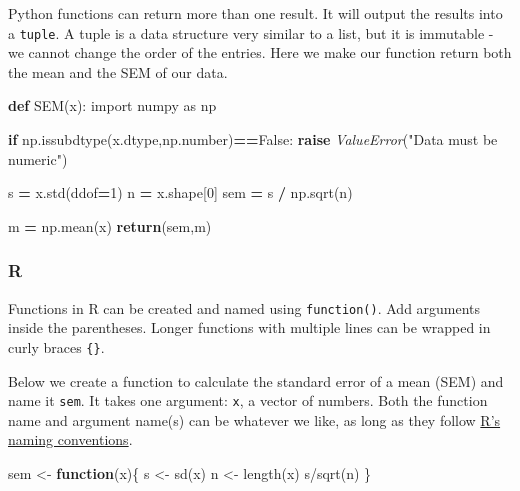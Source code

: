 \documentclass[
]{book}
\newenvironment{Shaded}{\begin{snugshade}}{\end{snugshade}}
\newcommand{\ControlFlowTok}[1]{\textcolor[rgb]{0.13,0.29,0.53}{\textbf{#1}}}
\newcommand{\DecValTok}[1]{\textcolor[rgb]{0.00,0.00,0.81}{#1}}
\newcommand{\FunctionTok}[1]{\textcolor[rgb]{0.00,0.00,0.00}{#1}}
\newcommand{\ImportTok}[1]{#1}
\newcommand{\KeywordTok}[1]{\textcolor[rgb]{0.13,0.29,0.53}{\textbf{#1}}}
\newcommand{\NormalTok}[1]{#1}
\newcommand{\OperatorTok}[1]{\textcolor[rgb]{0.81,0.36,0.00}{\textbf{#1}}}
\newcommand{\OtherTok}[1]{\textcolor[rgb]{0.56,0.35,0.01}{#1}}
\newcommand{\PreprocessorTok}[1]{\textcolor[rgb]{0.56,0.35,0.01}{\textit{#1}}}
\newcommand{\SpecialCharTok}[1]{\textcolor[rgb]{0.00,0.00,0.00}{#1}}
\newcommand{\StringTok}[1]{\textcolor[rgb]{0.31,0.60,0.02}{#1}}
\newcommand{\VariableTok}[1]{\textcolor[rgb]{0.00,0.00,0.00}{#1}}
\begin{document}
Python functions can return more than one result. It will output the results into a \texttt{tuple}. A tuple is a data structure very similar to a list, but it is immutable - we cannot change the order of the entries. Here we make our function return both the mean and the SEM of our data.

\begin{Shaded}
\begin{Highlighting}[]
\KeywordTok{def}\NormalTok{ SEM(x):}
  \ImportTok{import}\NormalTok{ numpy }\ImportTok{as}\NormalTok{ np}
  
  \ControlFlowTok{if}\NormalTok{ np.issubdtype(x.dtype,np.number)}\OperatorTok{==}\VariableTok{False}\NormalTok{:}
    \ControlFlowTok{raise} \PreprocessorTok{ValueError}\NormalTok{(}\StringTok{"Data must be numeric"}\NormalTok{)}
  
\NormalTok{  s }\OperatorTok{=}\NormalTok{ x.std(ddof}\OperatorTok{=}\DecValTok{1}\NormalTok{) }
\NormalTok{  n }\OperatorTok{=}\NormalTok{ x.shape[}\DecValTok{0}\NormalTok{] }
\NormalTok{  sem }\OperatorTok{=}\NormalTok{ s }\OperatorTok{/}\NormalTok{ np.sqrt(n) }
  
\NormalTok{  m }\OperatorTok{=}\NormalTok{ np.mean(x)}
  \ControlFlowTok{return}\NormalTok{(sem,m) }
\end{Highlighting}
\end{Shaded}

\hypertarget{r-7}{%
\subsubsection*{R}\label{r-7}}

Functions in R can be created and named using \texttt{function()}. Add arguments inside the parentheses. Longer functions with multiple lines can be wrapped in curly braces \texttt{\{\}}.

Below we create a function to calculate the standard error of a mean (SEM) and name it \texttt{sem}. It takes one argument: \texttt{x}, a vector of numbers. Both the function name and argument name(s) can be whatever we like, as long as they follow \href{https://cran.r-project.org/doc/manuals/r-release/R-intro.html\#R-commands_003b-case-sensitivity-etc}{R's naming conventions}.

\begin{Shaded}
\begin{Highlighting}[]
\NormalTok{sem }\OtherTok{\textless{}{-}} \ControlFlowTok{function}\NormalTok{(x)\{}
\NormalTok{  s }\OtherTok{\textless{}{-}} \FunctionTok{sd}\NormalTok{(x)}
\NormalTok{  n }\OtherTok{\textless{}{-}} \FunctionTok{length}\NormalTok{(x)}
\NormalTok{  s}\SpecialCharTok{/}\FunctionTok{sqrt}\NormalTok{(n)}
\NormalTok{\}}
\end{Highlighting}
\end{Shaded}
\end{document}
